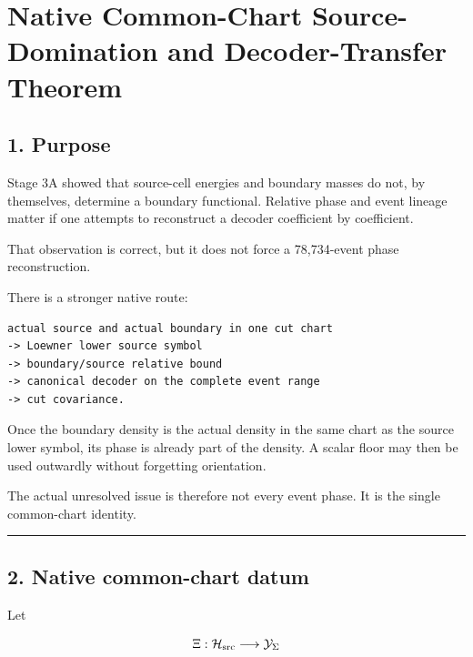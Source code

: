 \hypertarget{native-common-chart-source-domination-and-decoder-transfer-theorem}{%
\chapter{Native Common-Chart Source-Domination and Decoder-Transfer Theorem}\label{native-common-chart-source-domination-and-decoder-transfer-theorem}}

\hypertarget{purpose}{%
\section{1. Purpose}\label{purpose}}

Stage 3A showed that source-cell energies and boundary masses do not, by
themselves, determine a boundary functional. Relative phase and event lineage
matter if one attempts to reconstruct a decoder coefficient by coefficient.

That observation is correct, but it does not force a 78,734-event phase
reconstruction.

There is a stronger native route:

\begin{verbatim}
actual source and actual boundary in one cut chart
-> Loewner lower source symbol
-> boundary/source relative bound
-> canonical decoder on the complete event range
-> cut covariance.
\end{verbatim}

Once the boundary density is the actual density in the same chart as the source
lower symbol, its phase is already part of the density. A scalar floor may then
be used outwardly without forgetting orientation.

The actual unresolved issue is therefore not every event phase. It is the
single common-chart identity.

\begin{center}\rule{0.5\linewidth}{0.5pt}\end{center}

\hypertarget{native-common-chart-datum}{%
\section{2. Native common-chart datum}\label{native-common-chart-datum}}

Let

\[
\Xi:\mathcal H_{\rm src}\longrightarrow\mathcal Y_\Sigma
\]

